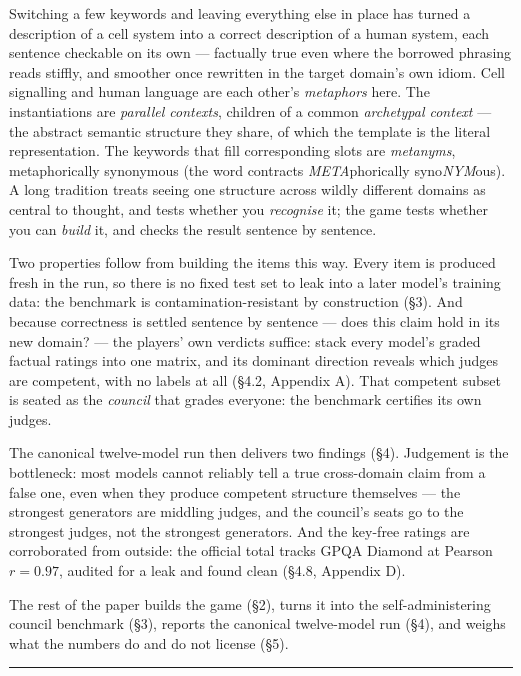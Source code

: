 Switching a few keywords and leaving everything else in place has turned a description of a cell system into a correct description of a human system, each sentence checkable on its own --- factually true even where the borrowed phrasing reads stiffly, and smoother once rewritten in the target domain's own idiom. Cell signalling and human language are each other's \emph{metaphors} here. The instantiations are \emph{parallel contexts}, children of a common \emph{archetypal context} --- the abstract semantic structure they share, of which the template is the literal representation. The keywords that fill corresponding slots are \emph{metanyms}, metaphorically synonymous (the word contracts \emph{META}phorically syno\emph{NYM}ous). A long tradition treats seeing one structure across wildly different domains as central to thought, and tests whether you \emph{recognise} it; the game tests whether you can \emph{build} it, and checks the result sentence by sentence.

Two properties follow from building the items this way. Every item is produced fresh in the run, so there is no fixed test set to leak into a later model's training data: the benchmark is contamination-resistant by construction (§3). And because correctness is settled sentence by sentence --- does this claim hold in its new domain? --- the players' own verdicts suffice: stack every model's graded factual ratings into one matrix, and its dominant direction reveals which judges are competent, with no labels at all (§4.2, Appendix A). That competent subset is seated as the \emph{council} that grades everyone: the benchmark certifies its own judges.

The canonical twelve-model run then delivers two findings (§4). Judgement is the bottleneck: most models cannot reliably tell a true cross-domain claim from a false one, even when they produce competent structure themselves --- the strongest generators are middling judges, and the council's seats go to the strongest judges, not the strongest generators. And the key-free ratings are corroborated from outside: the official total tracks GPQA Diamond at Pearson \(r = 0.97\), audited for a leak and found clean (§4.8, Appendix D).

The rest of the paper builds the game (§2), turns it into the self-administering council benchmark (§3), reports the canonical twelve-model run (§4), and weighs what the numbers do and do not license (§5).

\begin{center}\rule{0.5\linewidth}{0.5pt}\end{center}

